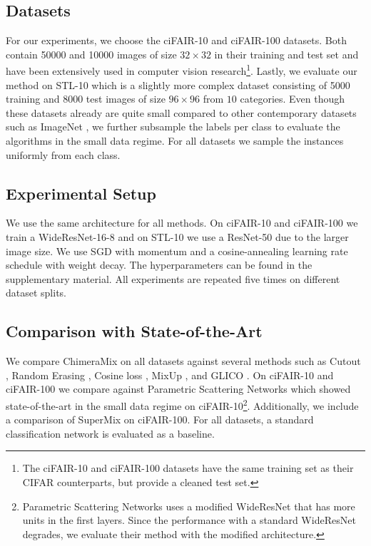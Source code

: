 \documentclass{article}
\newcommand{\methodname}{ChimeraMix\xspace}
\newcommand{\cifairX}{ciFAIR-10\xspace}
\newcommand{\cifairC}{ciFAIR-100\xspace}
\newcommand{\stl}{STL-10\xspace}
\begin{document}
\subsection{Datasets}

For our experiments, we choose the \cifairX and \cifairC \cite{barzWeTrainTest2020a} datasets.
Both contain \num{50000} and \num{10000} images of size $32 \times 32$ in their training and test set and have been extensively used in computer vision research\footnote{The \cifairX and \cifairC datasets have the same training set as their CIFAR \cite{krizhevskyLearningMultipleLayers2009} counterparts, but provide a cleaned test set.}.
Lastly, we evaluate our method on \stl \cite{coatesAnalysisSingleLayerNetworks2011} which is a slightly more complex dataset consisting of \num{5000} training and \num{8000} test images of size $96 \times 96$ from $10$ categories.
Even though these datasets already are quite small compared to other contemporary datasets such as ImageNet \cite{russakovskyImageNetLargeScale2015}, we further subsample the labels per class to evaluate the algorithms in the small data regime.
For all datasets we sample the instances uniformly from each class.

\subsection{Experimental Setup}

We use the same architecture for all methods.
On \cifairX and \cifairC we train a WideResNet-16-8 and on \stl we use a ResNet-50 due to the larger image size.
We use SGD with momentum and a cosine-annealing learning rate schedule with weight decay.
The hyperparameters can be found in the supplementary material. All experiments are repeated five times on different dataset splits.

\subsection{Comparison with State-of-the-Art}
\label{subsec:comparison_to_sota}

We compare \methodname on all datasets against several methods such as Cutout \cite{devriesImprovedRegularizationConvolutional2017}, Random Erasing \cite{zhongRandomErasingData2020}, Cosine loss \cite{barzDeepLearningSmall2020},  MixUp \cite{zhangMixupEmpiricalRisk2018}, and \ac{GLICO} \cite{azuriGenerativeLatentImplicit2021}.
On \cifairX and \cifairC we compare against Parametric Scattering Networks \cite{gauthierParametricScatteringNetworks2021} which showed state-of-the-art in the small data regime on \cifairX \footnote{Parametric Scattering Networks uses a modified WideResNet that has more units in the first layers. Since the performance with a standard WideResNet degrades, we evaluate their method with the modified architecture.}.
Additionally, we include a comparison of SuperMix \cite{daboueiSuperMixSupervisingMixing2021} on \cifairC. 
For all datasets, a standard classification network is evaluated as a baseline.
\end{document}
